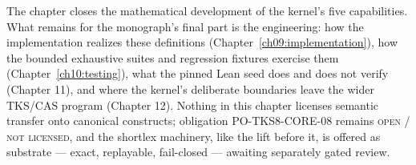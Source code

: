 The chapter closes the mathematical development of the kernel's five
capabilities. What remains for the monograph's final part is the
engineering: how the implementation realizes these definitions
(Chapter~\ref{ch09:implementation}), how the bounded exhaustive suites and
regression fixtures exercise them (Chapter~\ref{ch10:testing}), what the
pinned Lean seed does and does not verify (Chapter 11), and where the
kernel's deliberate boundaries leave the wider TKS/CAS program
(Chapter 12). Nothing in this chapter licenses semantic transfer onto
canonical constructs; obligation PO-TKS8-CORE-08 remains \textsc{open / not
licensed}, and the shortlex machinery, like the lift before it, is offered
as substrate --- exact, replayable, fail-closed --- awaiting separately
gated review.
